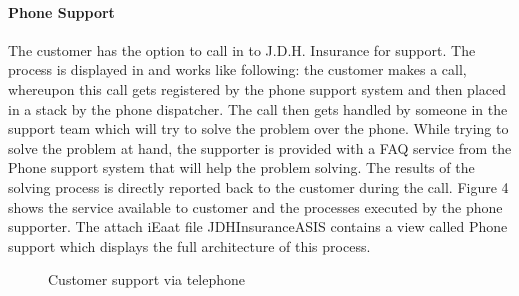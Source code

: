 \paragraph{Phone Support}
\label{sec:phone}
The customer has the option to call in to J.D.H. Insurance for support. The process is displayed in  and works like following: the customer makes a call, whereupon this call gets registered by the phone support system and then placed in a stack by the phone dispatcher. The call then gets handled by someone in the support team which will try to solve the problem over the phone. While trying to solve the problem at hand, the supporter is provided with a FAQ service from the Phone support system that will help the problem solving. The results of the solving process is directly reported back to the customer during the call. Figure 4 shows the service available to customer and the processes executed by the phone supporter. The attach iEaat file JDHInsuranceASIS contains a view called Phone support which displays the full architecture of this process. 
\begin{center}
	\begin{figure}[H]
		\centering
		\setlength\fboxsep{7pt}
		\setlength\fboxrule{0.5pt}
		\caption{Customer support via telephone}
		\label{fig:map_phone}
	\end{figure}
\end{center}
%

